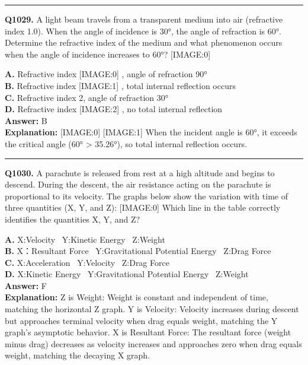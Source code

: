 \documentclass[12pt]{article}
\begin{document}
\hrule
\vspace{1em}


\noindent
\textbf{Q1029.} A light beam travels from a transparent medium into air (refractive index 1.0). When the angle of incidence is 30°, the angle of refraction is 60°. Determine the refractive index of the medium and what phenomenon occurs when the angle of incidence increases to 60°?
[IMAGE:0]



\textbf{A.} Refractive index
[IMAGE:0]
, angle of refraction 90° \\
\textbf{B.} Refractive index
[IMAGE:1]
, total internal reflection occurs \\
\textbf{C.} Refractive index 2, angle of refraction 30° \\
\textbf{D.} Refractive index
[IMAGE:2]
, no total internal reflection \\

\textbf{Answer:} B \\
\textbf{Explanation:} [IMAGE:0]
[IMAGE:1]
When the incident angle is 60°, it exceeds the critical angle (60° > 35.26°), so total internal reflection occurs.

\hrule
\vspace{1em}


\noindent
\textbf{Q1030.} A parachute is released from rest at a high altitude and begins to descend. During the descent, the air resistance acting on the parachute is proportional to its velocity. The graphs below show the variation with time of three quantities (X, Y, and Z):
[IMAGE:0]
Which line in the table correctly identifies the quantities X, Y, and Z?



\textbf{A.} X:Velocity  Y:Kinetic Energy  Z:Weight \\
\textbf{B.} X：Resultant Force  Y:Gravitational Potential Energy  Z:Drag Force \\
\textbf{C.} X:Acceleration  Y:Velocity  Z:Drag Force \\
\textbf{D.} X:Kinetic Energy  Y:Gravitational Potential Energy  Z:Weight \\

\textbf{Answer:} F \\
\textbf{Explanation:} \cdot 
Z is Weight: Weight is constant and independent of time, matching the horizontal Z graph.
\cdot 
Y is Velocity: Velocity increases during descent but approaches terminal velocity when drag equals weight, matching the Y graph's asymptotic behavior.
\cdot 
X is Resultant Force: The resultant force (weight minus drag) decreases as velocity increases and approaches zero when drag equals weight, matching the decaying X graph.
\end{document}
